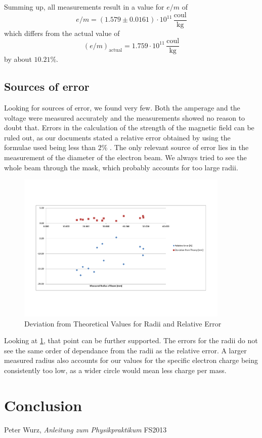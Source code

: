 \documentclass{scrreprt}
\newcommand{\unit}[1]{\ensuremath{\, \mathrm{#1}}}
\begin{document}
Summing up, all measurements result in a value for $e/m$ of
\begin{equation}
e/m = \left( 1.579 \pm 0.0161 \right)\cdot 10^{11} \unit{\frac{coul}{kg}}
\end{equation}
which differs from the actual value of 
\begin{equation}
(e/m)_{\text{actual}} = 1.759 \cdot 10^{11} \unit{\frac{coul}{kg}}
\end{equation}
by about $10.21\%$.

\subsection{Sources of error}
\label{sec:error}
Looking for sources of error, we found very few. Both the amperage and the voltage were measured accurately and the measurements showed no reason to doubt that. Errors in the calculation of the strength of the magnetic field can be ruled out, as our documents stated a relative error obtained by using the formulae used being less than $2\%$ \cite[p. 174]{physcript13}. 
The only relevant source of error lies in the measurement of the diameter of the electron beam. We always tried to see the whole beam through the mask, which probably accounts for too large radii. 
\begin{figure}[H]
	\centering
  \includegraphics[width=0.9\textwidth]{diag/errors.pdf}
	\caption{Deviation from Theoretical Values for Radii and Relative Error}
	\label{fig:error}
\end{figure}

Looking at \ref{fig:error}, that point can be further supported. The errors for the radii do not see the same order of dependance from the radii as the relative error. A larger measured radius also accounts for our values for the specific electron charge being consistently too low, as a wider circle would mean less charge per mass.

\section{Conclusion}

\begin{thebibliography}{9}

  Peter Wurz,
  \emph{Anleitung zum Physikpraktikum}
  FS2013

\end{thebibliography}
\end{document}
